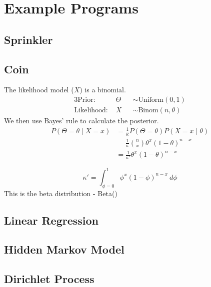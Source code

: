 \chapter{Example Programs} \label{app:examples}
\section{Sprinkler} \label{app:sprinkler}
\section{Coin} \label{app:coin}
The likelihood model ($X$) is a binomial.
% 
\begin{alignat*}{3}
	\text{Prior:~}      & \Theta &   & \sim \text{Uniform}(0,1)    \\
	\text{Likelihood:~} & X      &   & \sim \text{Binom}(n,\theta) 
\end{alignat*}
% 
We then use Bayes' rule to calculate the posterior.
\begin{align*}
	P(\Theta=\theta \mid X=x) & = \frac{1}{\kappa}P(\Theta=\theta)P(X=x\mid\theta)     \\ 
	                          & = \frac{1}{\kappa}\binom{n}{x}\theta^x(1-\theta)^{n-x} \\
	                          & = \frac{1}{\kappa'}\theta^x(1-\theta)^{n-x}            
\end{align*}

\[\kappa'=\int_{\phi=0}^1\phi^x(1-\phi)^{n-x}~d\phi\]
This is the beta distribution - Beta()
\section{Linear Regression} \label{app:linreg}
\section{Hidden Markov Model} \label{app:hmm}
\section{Dirichlet Process} \label{app:dp}
